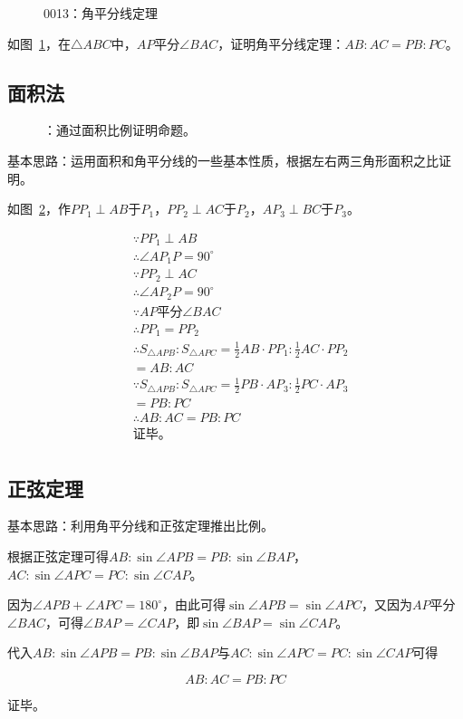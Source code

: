 

\begin{figure}[htbp]
  \centering
  \caption{0013：角平分线定理} \label{fig:0013}
\end{figure}

如图~\ref{fig:0013}，在$\triangle ABC$中，$AP$平分$\angle BAC$，证明角平分线定理：$AB:AC = PB:PC$。

\subsection{面积法} \label{subsec:0013-S}

\begin{figure}[htbp]
  \centering
  \caption{：通过面积比例证明命题。}
  \label{fig:0013-S}
\end{figure}

基本思路：运用面积和角平分线的一些基本性质，根据左右两三角形面积之比证明。

如图~\ref{fig:0013-S}，作$PP_1 \perp AB$于$P_1$，$PP_2 \perp AC$于$P_2$，$AP_3 \perp BC$于$P_3$。

\begin{align*}
  &\because   PP_1 \perp AB \\
  &\therefore \angle AP_1P = 90^\circ \\
  &\because   PP_2 \perp AC \\
  &\therefore \angle AP_2P = 90^\circ \\
  &\because   AP\text{平分}\angle BAC \\
  &\therefore PP_1 = PP_2 \\
  &\therefore S_{\triangle APB}:S_{\triangle APC} = \frac12AB\cdot PP_1:\frac12AC\cdot PP_2 \\& = AB:AC \\
  &\because   S_{\triangle APB}:S_{\triangle APC} = \frac12PB\cdot AP_3:\frac12PC\cdot AP_3 \\& = PB:PC \\
  &\therefore AB:AC = PB:PC \\
  &\text{证毕。} \\
\end{align*}

\subsection{正弦定理}

基本思路：利用角平分线和正弦定理推出比例。

根据正弦定理可得$AB:\sin\angle APB = PB:\sin\angle BAP$，$AC:\sin\angle APC = PC:\sin\angle CAP$。

因为$\angle APB + \angle APC = 180^\circ$，由此可得$\sin\angle APB = \sin\angle APC$，又因为$AP$平分$\angle BAC$，可得$\angle BAP = \angle CAP$，即$\sin\angle BAP = \sin\angle CAP$。

代入$AB:\sin\angle APB = PB:\sin\angle BAP$与$AC:\sin\angle APC = PC:\sin\angle CAP$可得

\[ AB:AC = PB:PC \]

证毕。
